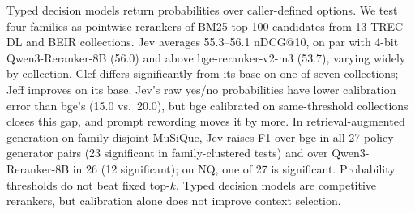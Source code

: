 Typed decision models return probabilities over caller-defined options.
We test four families as pointwise rerankers of BM25 top-100 candidates from 13 TREC DL and BEIR collections.
Jev averages 55.3--56.1 nDCG@10, on par with 4-bit Qwen3-Reranker-8B (56.0) and above bge-reranker-v2-m3 (53.7), varying widely by collection.
Clef differs significantly from its base on one of seven collections; Jeff improves on its base.
Jev's raw yes/no probabilities have lower calibration error than bge's (15.0 vs.\ 20.0), but bge calibrated on same-threshold collections closes this gap, and prompt rewording moves it by more.
In retrieval-augmented generation on family-disjoint MuSiQue, Jev raises F1 over bge in all 27 policy--generator pairs (23 significant in family-clustered tests) and over Qwen3-Reranker-8B in 26 (12 significant); on NQ, one of 27 is significant.
Probability thresholds do not beat fixed top-$k$.
Typed decision models are competitive rerankers, but calibration alone does not improve context selection.
